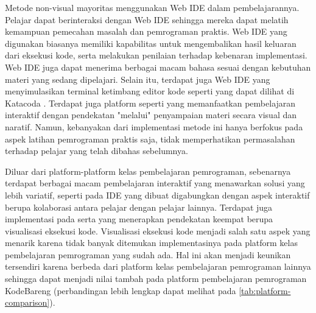 Metode non-visual mayoritas menggunakan Web IDE dalam pembelajarannya. Pelajar dapat berinteraksi dengan Web IDE sehingga mereka dapat melatih kemampuan pemecahan masalah dan pemrograman praktis. Web IDE yang digunakan biasanya memiliki kapabilitas untuk mengembalikan hasil keluaran dari eksekusi kode, serta melakukan penilaian terhadap kebenaran implementasi. Web IDE juga dapat menerima berbagai macam bahasa sesuai dengan kebutuhan materi yang sedang dipelajari. Selain itu, terdapat juga Web IDE yang menyimulasikan terminal ketimbang editor kode seperti yang dapat dilihat di Katacoda \parencite{katacoda2021media}. Terdapat juga platform seperti \textcite{progate2021media} yang memanfaatkan pembelajaran interaktif dengan pendekatan "melalui" penyampaian materi secara visual dan naratif. Namun, kebanyakan dari implementasi metode ini hanya berfokus pada aspek latihan pemrograman praktis saja, tidak memperhatikan permasalahan terhadap pelajar yang telah dibahas sebelumnya.

Diluar dari platform-platform kelas pembelajaran pemrograman, sebenarnya terdapat berbagai macam pembelajaran interaktif yang menawarkan solusi yang lebih variatif, seperti pada \textcite{tran2013interactive} IDE yang dibuat digabungkan dengan aspek interaktif berupa kolaborasi antara pelajar dengan pelajar lainnya. Terdapat juga implementasi pada \textcite{guo2013pythontutor} serta \textcite{moons2013pilot} yang menerapkan pendekatan keempat berupa visualisasi eksekusi kode. Visualisasi eksekusi kode menjadi salah satu aspek yang menarik karena tidak banyak ditemukan implementasinya pada platform kelas pembelajaran pemrograman yang sudah ada. Hal ini akan menjadi keunikan tersendiri karena berbeda dari platform kelas pembelajaran pemrograman lainnya sehingga dapat menjadi nilai tambah pada platform pembelajaran pemrograman KodeBareng (perbandingan lebih lengkap dapat melihat pada \autoref{tab:platform-comparison}).



